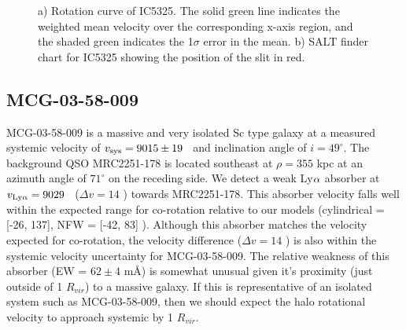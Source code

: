 \begin{figure}[ht]
\centering
  \caption{\small{a) Rotation curve of IC5325. The solid green line indicates the weighted mean velocity over the corresponding x-axis region, and the shaded green indicates the 1$\sigma$ error in the mean. b) SALT finder chart for IC5325 showing the position of the slit in red.}}
\vspace{0pt}
\end{figure}





\subsection{MCG-03-58-009}
MCG-03-58-009 is a massive and very isolated Sc type galaxy at a measured systemic velocity of $v_{\rm sys} = 9015 \pm 19$ \kms~and inclination angle of $i = 49^{\circ}$. The background QSO MRC2251-178 is located southeast at $\rho = 355$ kpc at an azimuth angle of $71^{\circ}$ on the receding side. We detect a weak Ly$\rm \alpha$ absorber at $v_{\rm Ly\alpha} = 9029$ \kms~($\Delta v = 14$ \kms) towards MRC2251-178. This absorber velocity falls well within the expected range for co-rotation relative to our models (cylindrical = [-26, 137], NFW = [-42, 83] \kms). Although this absorber matches the velocity expected for co-rotation, the velocity difference ($\Delta v = 14$ \kms) is also within the systemic velocity uncertainty for MCG-03-58-009. The relative weakness of this absorber (EW = $62 \pm 4$ m\AA) is somewhat unusual given it's proximity (just outside of 1 $R_{vir}$) to a massive galaxy. If this is representative of an isolated system such as MCG-03-58-009, then we should expect the halo rotational velocity to approach systemic by 1 $R_{vir}$.


